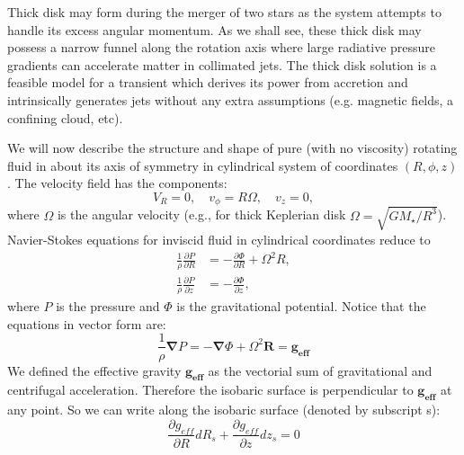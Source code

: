 \documentclass[a4paper,modern]{aastex62}
\renewcommand{\vec}[1]{\mathbf{#1}}
\begin{document}
Thick disk may form during the merger of two stars as the system attempts to handle its excess angular momentum.
As we shall see, these thick disk may possess a narrow funnel along the rotation axis where large radiative pressure gradients can accelerate matter in collimated jets. 
The thick disk solution is a feasible model for a transient which derives its power from accretion and intrinsically generates jets without any extra assumptions (e.g. magnetic fields, a confining cloud, etc).

We will now describe the structure and shape of pure (with no viscosity) rotating fluid in about its axis of symmetry in cylindrical system of coordinates $(R,\phi,z)$. 
The velocity field has the components: 
\begin{equation}\label{eq:velocity_field_components}
V_R=0, \quad v_\phi=R\Omega, \quad v_z=0,
\end{equation}
where $\Omega$ is the angular velocity (e.g., for thick Keplerian disk $\Omega=\sqrt{G M_\star / R^3}$).
Navier-Stokes equations for inviscid fluid in cylindrical coordinates reduce to
\begin{equation}
\begin{split}
\label{eq:inviscid_fluid}
\frac{1}{\rho} \frac{\partial P}{\partial R} &= - \frac{\partial \Phi}{\partial R} + \Omega^2R,  \\
\frac{1}{\rho} \frac{\partial P}{\partial z} &= - \frac{\partial \Phi}{\partial z} ,
\end{split}
\end{equation}
where $P$ is the pressure and $\Phi$ is the gravitational potential.
Notice that the equations in vector form are:
\begin{equation}\label{eq:vector_inviscid_fluid}
\frac{1}{\rho}\mathbf{\nabla} P = -\mathbf{\nabla}\Phi+\Omega^2\mathbf{R} = \vec{g_{eff}}
\end{equation}
We defined the effective gravity $\vec{g_{eff}}$ as the vectorial sum of gravitational and centrifugal acceleration. Therefore the isobaric surface is perpendicular to $\vec{g_{eff}}$ at any point.
So we can write along the isobaric surface (denoted by subscript s):
\begin{equation}
\frac{\partial g_{eff}}{\partial R} dR_s + \frac{\partial g_{eff}}{\partial z} dz_s =0
\end{equation}
\end{document}
